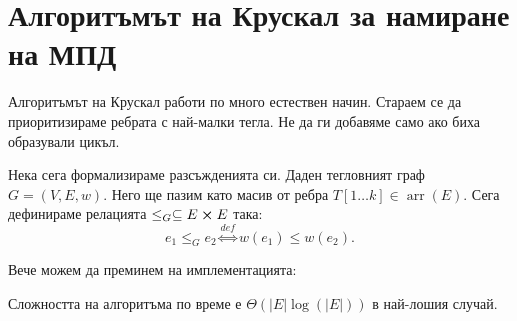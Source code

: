 \newpage

\section{Алгоритъмът на Крускал за намиране на МПД}

Алгоритъмът на Крускал работи по много естествен начин.
Стараем се да приоритизираме ребрата с най-малки тегла.
Не да ги добавяме само ако биха образували цикъл.

Нека сега формализираме разсъжденията си.
Даден тегловният граф $G = (V, E, w)$.
Него ще пазим като масив от ребра $T[1 \dots k] \in \operatorname{arr}(E)$.
Сега дефинираме релацията $\leq_G \subseteq E \cross E$ така:
\[
    e_1 \leq_G e_2 \stackrel{def}{\iff} w(e_1) \leq w(e_2).
\]

Вече можем да преминем на имплементацията:

Сложността на алгоритъма по време е $\Theta(|E|\log(|E|))$ в най-лошия случай.